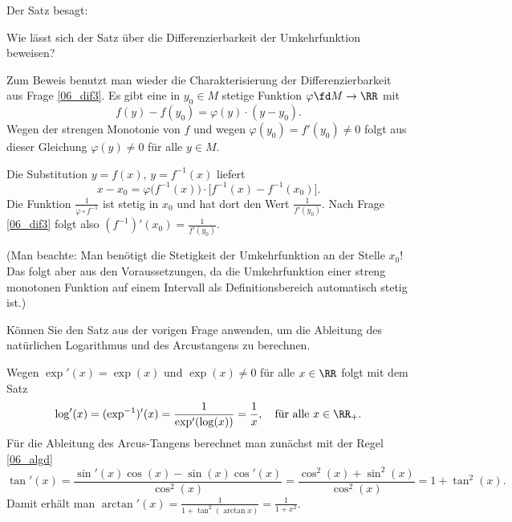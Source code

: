 \begin{antwort}
Der Satz besagt: 

\medskip
\noindent{}
\end{antwort} 

\begin{frage}\label{06_diffumkehr}
Wie lässt sich der Satz über die Differenzierbarkeit der 
Umkehrfunktion beweisen?
\end{frage}

\begin{antwort}
 Zum Beweis benutzt man wieder die Charakterisierung 
der Differenzierbarkeit 
aus Frage \ref{06_dif3}. Es gibt eine in $y_0\in M$ stetige Funktion 
$\varphi \fd M \to \RR$ mit 
\[
f(y)-f(y_0)=\varphi( y ) \cdot( y-y_0 ). 
\]
Wegen der strengen Monotonie von $f$ und 
wegen $\varphi(y_0)=f'(y_0) \not=0$ folgt aus dieser Gleichung  
$\varphi( y ) \not=0$ für alle $y\in M$. 

Die Substitution $y = f(x)$, $y = f^{-1}(x)$ liefert 
\[
x - x_0 = \varphi \big( f^{-1} ( x ) \big) \cdot 
\big[ f^{-1}(x)-f^{-1}(x_0) \big]. 
\]
Die Funktion $\frac{1}{\varphi \circ f^{-1}}$ 
ist stetig  in $x_0$ und hat 
dort den Wert $\frac{1}{f'(y_0)}$. 
Nach Frage \ref{06_dif3} folgt also 
$(f^{-1})'(x_0) = \frac{1}{f'(y_0)}$.

(Man beachte: Man benötigt die Stetigkeit der Umkehrfunktion 
an der Stelle $x_0$! Das folgt aber aus den Voraussetzungen, 
da die Umkehrfunktion einer streng monotonen Funktion auf einem Intervall 
als Definitionsbereich automatisch stetig ist.)
\AntEnd
\end{antwort}

\begin{frage}
Können Sie den Satz aus der vorigen Frage 
anwenden, um die Ableitung des natürlichen 
Logarithmus und des Arcustangens zu berechnen.
\end{frage}

\begin{antwort}
Wegen $\exp'(x)=\exp(x)$ und $\exp(x) \not =0$ für alle 
$x\in\RR$ folgt mit dem Satz 
\[
\log'(x) = (\exp^{-1})'(x) = \frac{1}{\exp'( \log(x) )} = \frac{1}{x}, 
\quad\text{für alle $x\in\RR_+$}.
\]
Für die Ableitung des Arcus-Tangens berechnet man zunächst mit 
der Regel \ref{06_algd}\,
\[
\tan'(x)= \frac{\sin'(x)\cos(x)-\sin(x)\cos'(x)}{\cos^2 (x)} = 
\frac{\cos^2(x)+\sin^2(x)}{\cos^2(x)} = 
1+\tan^2 (x). 
\] 
Damit erhält man $
\arctan'(x)= \frac{1}{1+ \tan^2 ( \arctan x ) } = \frac{1}{1+x^2}.$\AntEnd
\end{antwort}


